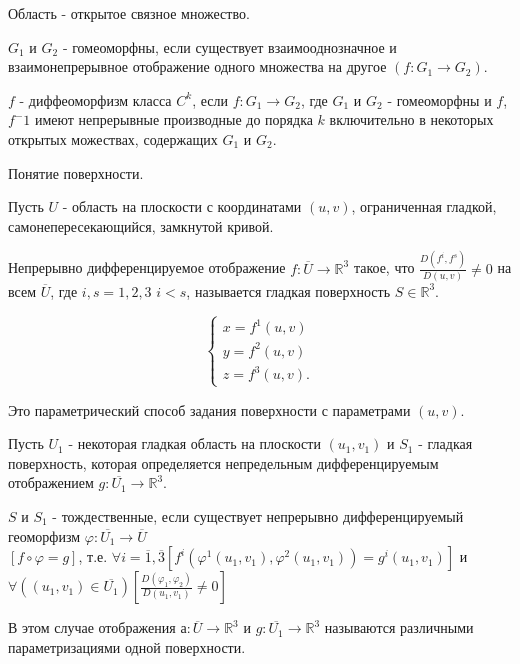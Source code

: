 \opred

Область - открытое связное множество.

\opred

$G_1$ и $G_2$ - гомеоморфны, если существует взаимооднозначное и взаимонепрерывное отображение одного множества на другое $(f: G_1 \rightarrow G_2)$.

\opred

$f$ - диффеоморфизм класса $C^k$, если $f: G_1 \rightarrow G_2$, где $G_1$ и $G_2$ - гомеоморфны и $f$, $f^-1$ имеют непрерывные производные до порядка $k$ включительно в некоторых открытых можествах, содержащих $G_1$ и $G_2$.

\opred

Понятие поверхности.

Пусть $U$ - область на плоскости с координатами $(u,v)$, ограниченная гладкой, самонепересекающийся, замкнутой кривой.

Непрерывно дифференцируемое отображение $f: \overline{U} \rightarrow \mathbb {R}^3$ такое, что $\frac{D(f^i, f^s)}{D(u,v)} \neq 0$ на всем $\overline{U}$, где $i,s = 1,2,3$ $i<s$, называется гладкая поверхность $S \in \mathbb {R}^3$.

\begin{equation*}
 \begin{cases}
   x = f^1(u,v) 
   \\
   y = f^2(u,v)
   \\
   z = f^3(u,v).
 \end{cases}
\end{equation*}

Это параметрический способ задания поверхности с параметрами $(u,v)$.

Пусть $U_1$ - некоторая гладкая область на плоскости $(u_1,v_1)$ и $S_1$ - гладкая поверхность, которая определяется непредельным дифференцируемым отображением $g: \overline{U_1} \rightarrow \mathbb {R}^3$.

\opred

$S$ и $S_1$ - тождественные, если существует непрерывно дифференцируемый геоморфизм $\varphi: \overline{U_1} \rightarrow \overline{U}$ 
\\
$[f \circ \varphi = g]$, т.е. $\forall i=\overline{1},\overline{3}[f^i(\varphi^1(u_1,v_1),\varphi^2(u_1,v_1)) = g^i(u_1,v_1)]$ и 
\\
$\forall((u_1, v_1) \in \overline{U_1})[\frac{D(\varphi_1, \varphi_2)}{D(u_1,v_1)} \neq 0]$

В этом случае отображения $а: \overline{U} \rightarrow \mathbb {R}^3$ и $g: \overline{U_1} \rightarrow \mathbb {R}^3$ называются различными параметризациями одной поверхности.

